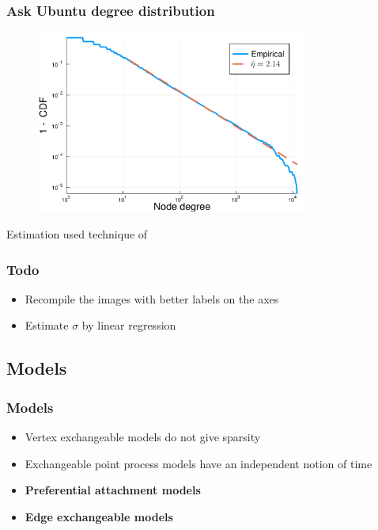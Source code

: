 \documentclass[final,hyperref={pdfpagelabels=false},noamsthm]{beamer}
\begin{document}
\begin{frame}
	\frametitle{Ask Ubuntu degree distribution}
	\begin{figure}[h]
		\includegraphics[width=0.8\textwidth]{fig/nodes_degre_power_law_askubuntu.pdf}
	\end{figure}
	
	Estimation used technique of \cite{clauset}
	
\end{frame}

\begin{frame}
	\frametitle{Todo}
	\begin{itemize}
		\item Recompile the images with better labels on the axes
		\item Estimate $\sigma$ by linear regression
	\end{itemize}
	
\end{frame}

\subsection{Models}
\begin{frame}
	\frametitle{Models}
	\begin{itemize}
		\item Vertex exchangeable models do not give sparsity \cite{aldous1981} \cite{hoover1979}
		\item Exchangeable point process models \cite{caronfox} have an independent notion of time
		\item \textbf{Preferential attachment models} \cite{barabasi1999}
		\item \textbf{Edge exchangeable models} \cite{CraneDempsey2017} \cite{cai2016}
	\end{itemize}
\end{frame}
\end{document}
